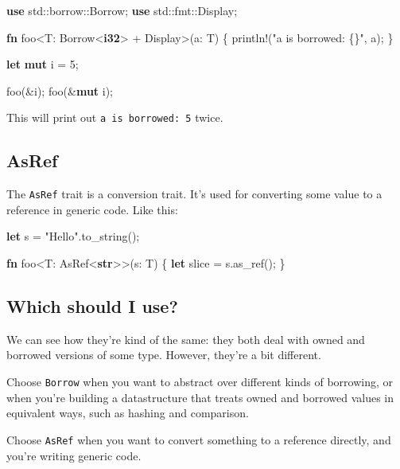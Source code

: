 \documentclass[a4paper,]{book}
\newenvironment{Shaded}{\begin{snugshade}}{\end{snugshade}}
\newcommand{\KeywordTok}[1]{\textcolor[rgb]{0.13,0.29,0.53}{\textbf{{#1}}}}
\newcommand{\DecValTok}[1]{\textcolor[rgb]{0.00,0.00,0.81}{{#1}}}
\newcommand{\StringTok}[1]{\textcolor[rgb]{0.31,0.60,0.02}{{#1}}}
\newcommand{\OtherTok}[1]{\textcolor[rgb]{0.56,0.35,0.01}{{#1}}}
\newcommand{\NormalTok}[1]{{#1}}
\begin{document}
\begin{Shaded}
\begin{Highlighting}[]
\KeywordTok{use} \NormalTok{std::borrow::Borrow;}
\KeywordTok{use} \NormalTok{std::fmt::Display;}

\KeywordTok{fn} \NormalTok{foo<T: Borrow<}\KeywordTok{i32}\NormalTok{> + Display>(a: T) \{}
    \OtherTok{println!}\NormalTok{(}\StringTok{"a is borrowed: \{\}"}\NormalTok{, a);}
\NormalTok{\}}

\KeywordTok{let} \KeywordTok{mut} \NormalTok{i = }\DecValTok{5}\NormalTok{;}

\NormalTok{foo(&i);}
\NormalTok{foo(&}\KeywordTok{mut} \NormalTok{i);}
\end{Highlighting}
\end{Shaded}

This will print out \texttt{a\ is\ borrowed:\ 5} twice.

\subsection{AsRef}\label{asref}

The \texttt{AsRef} trait is a conversion trait. It's used for converting
some value to a reference in generic code. Like this:

\begin{Shaded}
\begin{Highlighting}[]
\KeywordTok{let} \NormalTok{s = }\StringTok{"Hello"}\NormalTok{.to_string();}

\KeywordTok{fn} \NormalTok{foo<T: AsRef<}\KeywordTok{str}\NormalTok{>>(s: T) \{}
    \KeywordTok{let} \NormalTok{slice = s.as_ref();}
\NormalTok{\}}
\end{Highlighting}
\end{Shaded}

\subsection{Which should I use?}\label{which-should-i-use}

We can see how they're kind of the same: they both deal with owned and
borrowed versions of some type. However, they're a bit different.

Choose \texttt{Borrow} when you want to abstract over different kinds of
borrowing, or when you're building a datastructure that treats owned and
borrowed values in equivalent ways, such as hashing and comparison.

Choose \texttt{AsRef} when you want to convert something to a reference
directly, and you're writing generic code.
\end{document}

